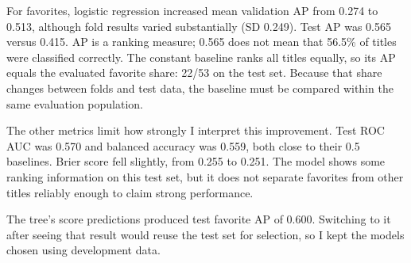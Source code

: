 \documentclass[10pt,a4paper]{article}
\begin{document}
For favorites, logistic regression increased mean validation AP from 0.274 to 0.513, although fold results varied substantially (SD 0.249). Test AP was 0.565 versus 0.415. AP is a ranking measure; 0.565 does not mean that 56.5\% of titles were classified correctly. The constant baseline ranks all titles equally, so its AP equals the evaluated favorite share: 22/53 on the test set. Because that share changes between folds and test data, the baseline must be compared within the same evaluation population.

The other metrics limit how strongly I interpret this improvement. Test ROC AUC was 0.570 and balanced accuracy was 0.559, both close to their 0.5 baselines. Brier score fell slightly, from 0.255 to 0.251. The model shows some ranking information on this test set, but it does not separate favorites from other titles reliably enough to claim strong performance.

The tree's score predictions produced test favorite AP of 0.600. Switching to it after seeing that result would reuse the test set for selection, so I kept the models chosen using development data.

\clearpage
\end{document}
